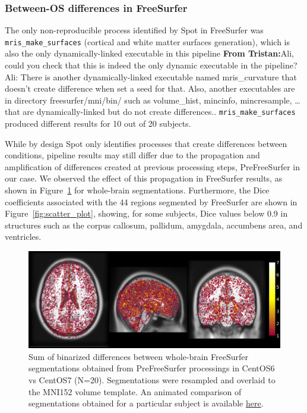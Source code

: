 \documentclass[a4paper,num-refs]{oup-contemporary}
\newcommand{\tristan}[1]{\color{blue}\textbf{From Tristan:}#1\color{black}}
\newcommand{\toolname}[0]{Spot\xspace}
\begin{document}
\subsubsection{Between-OS differences in FreeSurfer} 

The only non-reproducible process identified by \toolname in FreeSurfer was
\texttt{mris\_make\_surfaces} (cortical and white matter surfaces
generation), which is also the only dynamically-linked executable in this pipeline
\tristan{Ali, could you check that this is indeed the only dynamic
executable in the pipeline?
Ali: There is another dynamically-linked executable named mris\_curvature 
that doesn't create difference when set a seed for that.
Also, another executables are in directory freesurfer/mni/bin/ such as volume\_hist, 
mincinfo, mincresample, \dots
that are dynamically-linked but do not create differences.}. 
\texttt{mris\_make\_surfaces} produced different results for
10 out of 20 subjects. 

While by design \toolname only identifies processes that create differences
between conditions, pipeline results may still differ due to the
propagation and amplification of differences created at previous processing
steps, PreFreeSurfer in our case. We observed the effect of this
propagation in FreeSurfer results, as shown in
Figure~\ref{fig:tissue_class} for whole-brain segmentations. Furthermore,
the Dice coefficients associated with the 44 regions segmented by
FreeSurfer are shown in Figure~\ref{fig:scatter_plot}, showing, for some subjects, Dice values
below 0.9 in structures such as the corpus callosum, pallidum, amygdala,
accumbens area, and ventricles.



\begin{figure}
\centering
  \includegraphics[width=\columnwidth]{images/brain_segmentation_mni.png} 
  \caption{Sum of binarized differences between whole-brain FreeSurfer
  segmentations obtained from PreFreeSurfer processings in CentOS6 vs CentOS7
   (N=20). Segmentations were resampled and overlaid to the MNI152 volume
  template. An animated comparison of segmentations obtained for a particular subject is available
\href{https://github.com/big-data-lab-team/HCP-reproducibility-paper/blob/master/images/fs_brain_segmentation.gif}
{here}.
} 
  \label{fig:tissue_class}
\end{figure}
\end{document}
